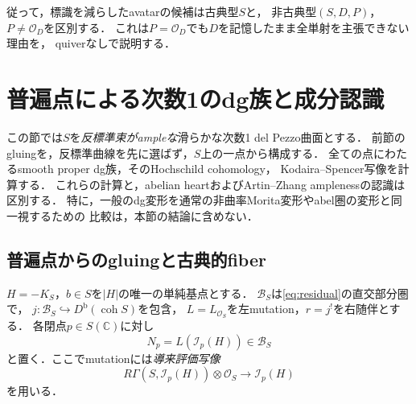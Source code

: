 \documentclass[11pt,a4paper]{ltjsarticle}
\theoremstyle{definition}
\newcommand{\OO}{\mathcal O}
\newcommand{\BB}{\mathcal B}
\newcommand{\Db}{D^{\mathrm b}}
\newcommand{\coh}{\operatorname{coh}}
\begin{document}
従って，標識を減らしたavatarの候補は古典型$S$と，
非古典型$(S,D,P)$，$P\ne\OO_D$を区別する．
これは$P=\OO_D$でも$D$を記憶したまま全単射を主張できない理由を，
quiverなしで説明する．

\section{普遍点による次数1のdg族と成分認識}
\label{sec:pointed-dg-family}

この節では$S$を\emph{反標準束がampleな}滑らかな次数1 del Pezzo曲面とする．
前節のgluingを，反標準曲線を先に選ばず，$S$上の一点から構成する．
全ての点にわたるsmooth proper dg族，そのHochschild cohomology，
Kodaira--Spencer写像を計算する．
これらの計算と，abelian heartおよびArtin--Zhang amplenessの認識は区別する．
特に，一般のdg変形を通常の非曲率Morita変形やabel圏の変形と同一視するための
比較は，本節の結論に含めない．

\subsection{普遍点からのgluingと古典的fiber}

$H=-K_S$，$b\in S$を$|H|$の唯一の単純基点とする．
$\BB_S$は\eqref{eq:residual}の直交部分圏で，
$j:\BB_S\hookrightarrow\Db(\coh S)$を包含，
$L=L_{\OO_S}$を左mutation，$r=j^!$を右随伴とする．
各閉点$p\in S(\mathbb C)$に対し
\begin{equation}\label{eq:universal-gluing-object}
 N_p=L(\mathcal I_p(H))\in\BB_S
\end{equation}
と置く．ここでmutationには\emph{導来評価写像}
\[
 R\Gamma(S,\mathcal I_p(H))\otimes\OO_S\longrightarrow\mathcal I_p(H)
\]
を用いる．
\end{document}
